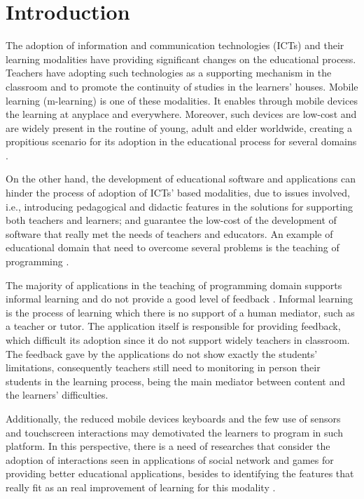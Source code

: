 
\section{Introduction}
\label{sec:introdcution}

The adoption of information and communication technologies (ICTs) and their learning modalities have providing significant changes on the educational process. Teachers have adopting such technologies as a supporting mechanism in the classroom and to promote the continuity of studies in the learners' houses. Mobile learning (m-learning) is one of these modalities. It enables through mobile devices the learning at anyplace and everywhere. Moreover, such devices are low-cost and are widely present in the routine of young, adult and elder worldwide, creating a propitious scenario for its adoption in the educational process for several domains \cite{marcolino_edu2015, marcolinoarcht2017}.

On the other hand, the development of educational software and applications can hinder the process of adoption of ICTs' based modalities, due to issues involved, i.e., introducing pedagogical and didactic features in the solutions for supporting both teachers and learners; and guarantee the low-cost of the development of software that really met the needs of teachers and educators. An example of educational domain that need to overcome several problems is the teaching of programming \cite{souza2015}.

The majority of applications in the teaching of programming domain supports informal learning and do not provide a good level of feedback \cite{marcolino_edu2015}. Informal learning is the process of learning which there is no support of a human mediator, such as a teacher or tutor. The application itself is responsible for providing feedback, which difficult its adoption since it do not support widely teachers in classroom. The feedback gave by the applications do not show exactly the students' limitations, consequently teachers still need to monitoring in person their students in the learning process, being the main mediator between content and the learners' difficulties. 


Additionally, the reduced mobile devices keyboards and the few use of sensors and touchscreen interactions may demotivated the learners to program in such platform. In this perspective, there is a need of researches that consider the adoption of interactions seen in applications of social network and games for providing better educational applications, besides to identifying the features that really fit as an real improvement of learning for this modality \cite{marcolino_edu2015}.



